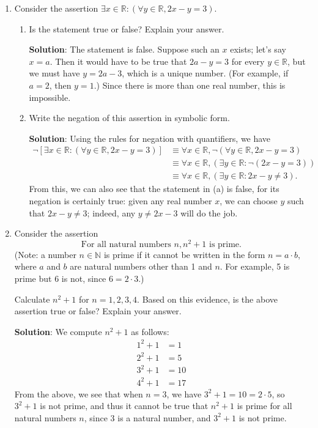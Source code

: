 \documentclass[12pt]{article}
\newcommand{\points}[1]{\marginpar{\hspace{24pt}[#1]}}
\newcommand{\R}{\mathbb{R}}
\begin{document}
\thispagestyle{fancy}

 \begin{enumerate}
 \item  Consider the assertion $\exists x\in\R: (\forall y\in\R, 2x-y=3)$.
\begin{enumerate}
 \item Is the statement true or false? Explain your answer. \points{3}

\bigskip

{\bf Solution}: The statement is false. Suppose such an $x$ exists; let's say $x=a$. Then it would have to be true that $2a-y=3$ for every $y\in\R$, but we must have $y=2a-3$, which is a unique number. (For example, if $a=2$, then $y=1$.) Since there is more than one real number, this is impossible.

\bigskip

 \item Write the negation of this assertion in symbolic form. \points{3}

\bigskip

{\bf Solution}: Using the rules for negation with quantifiers, we have
\begin{align*}
 \neg[\exists x\in\R: (\forall y\in \R, 2x-y=3)] &\equiv \forall x\in \R, \neg(\forall y\in \R, 2x-y=3)\\
&\equiv \forall x\in\R, (\exists y\in \R: \neg(2x-y=3))\\
&\equiv \forall x\in\R, (\exists y\in \R: 2x-y\neq 3).
\end{align*}
From this, we can also see that the statement in (a) is false, for its negation is certainly true: given any real number $x$, we can choose $y$ such that $2x-y\neq 3$; indeed, any $y\neq 2x-3$ will do the job.
\end{enumerate}
\newpage

\item Consider the assertion
\points{4}
\[
 \text{For all natural numbers } n, n^2+1 \text{ is prime.}
\]
(Note: a number $n\in\mathbb{N}$ is prime if it cannot be written in the form $n=a\cdot b$, where $a$ and $b$ are natural numbers other than 1 and $n$. For example, 5 is prime but 6 is not, since $6=2\cdot 3$.)

Calculate $n^2+1$ for $n=1,2,3,4.$ Based on this evidence, is the above assertion true or false? Explain your answer.

\bigskip

{\bf Solution}: We compute $n^2+1$ as follows:
\begin{align*}
 1^2 +1 & = 1\\
 2^2 +1 & = 5\\
 3^2 +1 & = 10\\
 4^2 +1 & = 17
\end{align*}
From the above, we see that when $n=3$, we have $3^2+1 = 10 = 2\cdot 5$, so $3^2+1$ is not prime, and thus it cannot be true that $n^2+1$ is prime for all natural numbers $n$, since 3 is a natural number, and $3^2+1$ is not prime.

 \end{enumerate}
\end{document}
